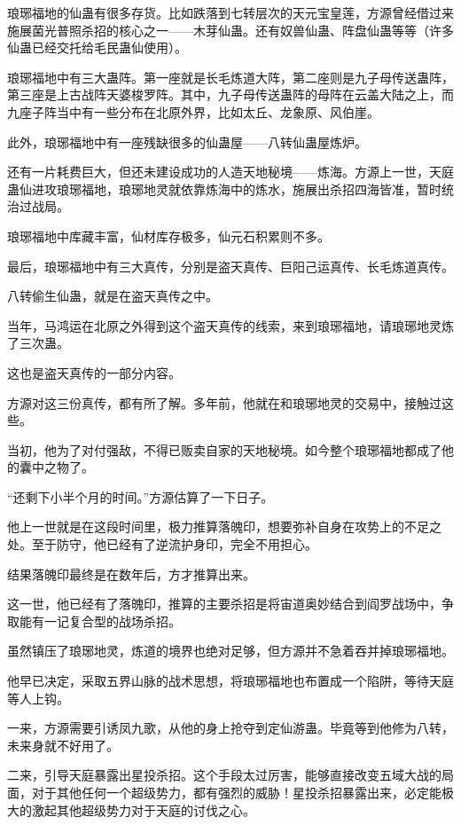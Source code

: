 \begin{this_body}
琅琊福地的仙蛊有很多存货。比如跌落到七转层次的天元宝皇莲，方源曾经借过来施展菌光普照杀招的核心之一——木芽仙蛊。还有奴兽仙蛊、阵盘仙蛊等等（许多仙蛊已经交托给毛民蛊仙使用）。

琅琊福地中有三大蛊阵。第一座就是长毛炼道大阵，第二座则是九子母传送蛊阵，第三座是上古战阵天婆梭罗阵。其中，九子母传送蛊阵的母阵在云盖大陆之上，而九座子阵当中有一些分布在北原外界，比如太丘、龙象原、风伯崖。

此外，琅琊福地中有一座残缺很多的仙蛊屋——八转仙蛊屋炼炉。

还有一片耗费巨大，但还未建设成功的人造天地秘境——炼海。方源上一世，天庭蛊仙进攻琅琊福地，琅琊地灵就依靠炼海中的炼水，施展出杀招四海皆准，暂时统治过战局。

琅琊福地中库藏丰富，仙材库存极多，仙元石积累则不多。

最后，琅琊福地中有三大真传，分别是盗天真传、巨阳己运真传、长毛炼道真传。

八转偷生仙蛊，就是在盗天真传之中。

当年，马鸿运在北原之外得到这个盗天真传的线索，来到琅琊福地，请琅琊地灵炼了三次蛊。

这也是盗天真传的一部分内容。

方源对这三份真传，都有所了解。多年前，他就在和琅琊地灵的交易中，接触过这些。

当初，他为了对付强敌，不得已贩卖自家的天地秘境。如今整个琅琊福地都成了他的囊中之物了。

“还剩下小半个月的时间。”方源估算了一下日子。

他上一世就是在这段时间里，极力推算落魄印，想要弥补自身在攻势上的不足之处。至于防守，他已经有了逆流护身印，完全不用担心。

结果落魄印最终是在数年后，方才推算出来。

这一世，他已经有了落魄印，推算的主要杀招是将宙道奥妙结合到阎罗战场中，争取能有一记复合型的战场杀招。

虽然镇压了琅琊地灵，炼道的境界也绝对足够，但方源并不急着吞并掉琅琊福地。

他早已决定，采取五界山脉的战术思想，将琅琊福地也布置成一个陷阱，等待天庭等人上钩。

一来，方源需要引诱凤九歌，从他的身上抢夺到定仙游蛊。毕竟等到他修为八转，未来身就不好用了。

二来，引导天庭暴露出星投杀招。这个手段太过厉害，能够直接改变五域大战的局面，对于其他任何一个超级势力，都有强烈的威胁！星投杀招暴露出来，必定能极大的激起其他超级势力对于天庭的讨伐之心。


\end{this_body}
